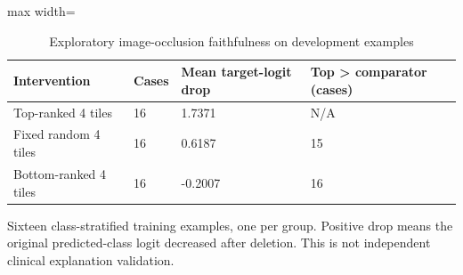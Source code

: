 \begin{table}[t]
\centering
\small
\caption{Exploratory image-occlusion faithfulness on development examples}
\label{tab:10-xai-occlusion}
\begin{adjustbox}{max width=\textwidth}
\begin{tabular}{llll}
\toprule
\textbf{Intervention} & \textbf{Cases} & \textbf{Mean target-logit drop} & \textbf{Top \textgreater{} comparator (cases)} \\
\midrule
Top-ranked 4 tiles & 16 & 1.7371 & N/A \\
Fixed random 4 tiles & 16 & 0.6187 & 15 \\
Bottom-ranked 4 tiles & 16 & -0.2007 & 16 \\
\bottomrule
\end{tabular}
\end{adjustbox}
\par\smallskip
\begin{minipage}{\textwidth}\footnotesize Sixteen class-stratified training examples, one per group. Positive drop means the original predicted-class logit decreased after deletion. This is not independent clinical explanation validation.\end{minipage}
\end{table}
